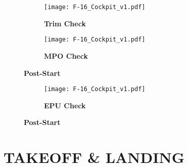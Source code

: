 \begin{figure}[h]
    \centering
    \begin{subfigure}[t]{0.3\linewidth}
        \centering
        \texttt{[image: F-16\_Cockpit\_v1.pdf]}
        \caption*{\textbf{Trim Check}}
    \end{subfigure}
    \begin{subfigure}[t]{0.3\linewidth}
        \centering
        \texttt{[image: F-16\_Cockpit\_v1.pdf]}
        \caption*{\textbf{MPO Check}}
    \end{subfigure}
    \caption{\textbf{Post-Start}}
    \label{fig:proc:testschecks3}
\end{figure}

\clearpage

\begin{tablenumerate}[resume]
\end{tablenumerate}

\begin{figure}[h]
    \centering
    \begin{subfigure}[t]{0.45\linewidth}
        \centering
        \texttt{[image: F-16\_Cockpit\_v1.pdf]}
        \caption*{\textbf{EPU Check}}
    \end{subfigure}
    \caption{\textbf{Post-Start}}
    \label{fig:proc:testschecks4}
\end{figure}

\clearpage

\section{TAKEOFF \& LANDING}



\cleardoublepage